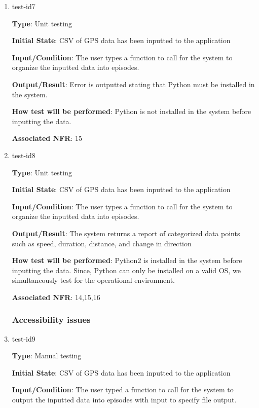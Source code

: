 \documentclass[12pt, titlepage]{article}
\begin{document}
\begin{enumerate}

\item{test-id7\\}

\textbf{Type}: Unit testing
					
\textbf{Initial State}: CSV of GPS data has been inputted to the application
					
\textbf{Input/Condition}: The user types a function to call for the system to organize the
inputted data into episodes. 
					
\textbf{Output/Result}: Error is outputted stating that Python must be installed in the system.
					
\textbf{How test will be performed}: Python is not installed in the system before inputting the data. 

\textbf{Associated NFR}: 15

\item{test-id8\\}

\textbf{Type}: Unit testing
					
\textbf{Initial State}: CSV of GPS data has been inputted to the application
					
\textbf{Input/Condition}: The user types a function to call for the system to organize the
inputted data into episodes. 
					
\textbf{Output/Result}: The system returns a report of categorized data points such
as speed, duration, distance, and change in direction
					
\textbf{How test will be performed}: Python2 is installed in the system before inputting the data. Since, Python can only be installed on a valid OS, we simultaneously test for the operational environment.

\textbf{Associated NFR}: 14,15,16

\subsubsection{Accessibility issues}

\item{test-id9\\}

\textbf{Type}: Manual testing
					
\textbf{Initial State}: CSV of GPS data has been inputted to the application
					
\textbf{Input/Condition}: The user typed a function to call for the system to output the
inputted data into episodes with input to specify file output. 
					

\end{enumerate}
\end{document}
